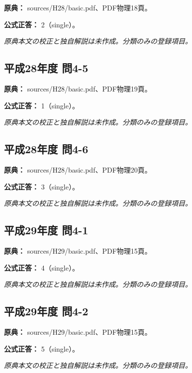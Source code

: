 \noindent\textbf{原典：} sources/H28/basic.pdf、PDF物理18頁。

\textbf{公式正答：} 2（single）。

\par\textit{原典本文の校正と独自解説は未作成。分類のみの登録項目。}

\subsection{平成28年度 問4-5}
\label{q:h28-reg-basic-4-5}

\noindent\textbf{原典：} sources/H28/basic.pdf、PDF物理19頁。

\textbf{公式正答：} 1（single）。

\par\textit{原典本文の校正と独自解説は未作成。分類のみの登録項目。}

\subsection{平成28年度 問4-6}
\label{q:h28-reg-basic-4-6}

\noindent\textbf{原典：} sources/H28/basic.pdf、PDF物理20頁。

\textbf{公式正答：} 3（single）。

\par\textit{原典本文の校正と独自解説は未作成。分類のみの登録項目。}

\subsection{平成29年度 問4-1}
\label{q:h29-reg-basic-4-1}

\noindent\textbf{原典：} sources/H29/basic.pdf、PDF物理15頁。

\textbf{公式正答：} 4（single）。

\par\textit{原典本文の校正と独自解説は未作成。分類のみの登録項目。}

\subsection{平成29年度 問4-2}
\label{q:h29-reg-basic-4-2}

\noindent\textbf{原典：} sources/H29/basic.pdf、PDF物理15頁。

\textbf{公式正答：} 5（single）。

\par\textit{原典本文の校正と独自解説は未作成。分類のみの登録項目。}

